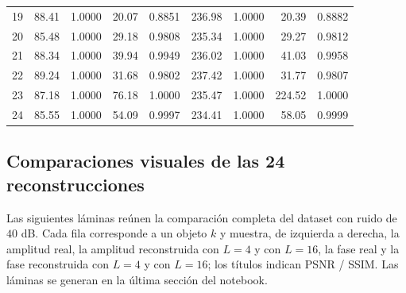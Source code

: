 \documentclass[11pt,a4paper]{article}
\begin{document}
\begin{table}[H]
\begin{tabular}{r r r r r r r r r}
19 & 88.41 & 1.0000 & 20.07 & 0.8851 & 236.98 & 1.0000 & 20.39 & 0.8882 \\
20 & 85.48 & 1.0000 & 29.18 & 0.9808 & 235.34 & 1.0000 & 29.27 & 0.9812 \\
21 & 88.34 & 1.0000 & 39.94 & 0.9949 & 236.02 & 1.0000 & 41.03 & 0.9958 \\
22 & 89.24 & 1.0000 & 31.68 & 0.9802 & 237.42 & 1.0000 & 31.77 & 0.9807 \\
23 & 87.18 & 1.0000 & 76.18 & 1.0000 & 235.47 & 1.0000 & 224.52 & 1.0000 \\
24 & 85.55 & 1.0000 & 54.09 & 0.9997 & 234.41 & 1.0000 & 58.05 & 0.9999 \\
\bottomrule
\end{tabular}
\end{table}

\subsection{Comparaciones visuales de las 24 reconstrucciones}
\label{app:visual}

Las siguientes láminas reúnen la comparación completa del dataset con ruido de $40$ dB. Cada fila corresponde a un objeto $k$ y muestra, de izquierda a derecha, la amplitud real, la amplitud reconstruida con $L=4$ y con $L=16$, la fase real y la fase reconstruida con $L=4$ y con $L=16$; los títulos indican PSNR / SSIM. Las láminas se generan en la última sección del notebook.
\end{document}
